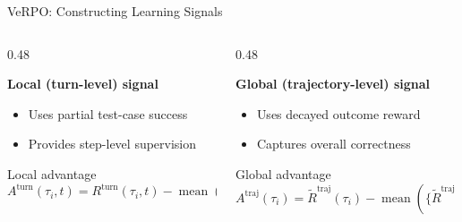 \documentclass[
  english,            %
  aspectratio=169,    %
]{tumbeamer}
\begin{document}
\begin{frame}{VeRPO: Constructing Learning Signals}

\begin{columns}[b,onlytextwidth] %

\begin{column}{0.48\textwidth} %

\textbf{Local (turn-level) signal}
\vspace{1mm}
\begin{itemize}
    \item Uses partial test-case success
    \item Provides step-level supervision
\end{itemize}

\vspace{2mm}

\begin{block}{Local advantage}
\vspace{-2mm}
\[
A^{\text{turn}}(\tau_i, t)
= R^{\text{turn}}(\tau_i, t)
- \operatorname{mean}(G(\mathcal{G}_x))
\]
\vspace{-4mm} %
\end{block}

\end{column}

\hfill %

\begin{column}{0.48\textwidth}
\vspace{0pt}

\textbf{Global (trajectory-level) signal}
\vspace{1mm}
\begin{itemize}
    \item Uses decayed outcome reward
    \item Captures overall correctness
\end{itemize}

\vspace{2mm}

\begin{block}{Global advantage}
\vspace{-2mm}
\[
A^{\text{traj}}(\tau_{i})
= \tilde{R}^{\text{traj}}(\tau_{i})
- \operatorname{mean}(\{\tilde{R}^{\text{traj}}(\tau_{j})\}_{j=1}^N)
\]
\vspace{-4mm}
\end{block}

\end{column}

\end{columns}

\end{frame}
\end{document}
